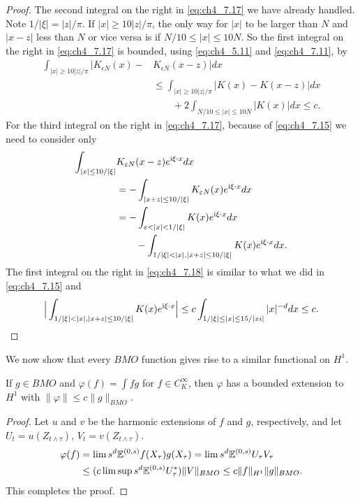 \begin{proof}
The second integral on the right in \eqref{eq:ch4_7.17} we have already handled. Note $1/|\xi| = |z|/\pi$. If $|x| \geq 10|z|/\pi$, the only way for $|x|$ to be larger than $N$ and $|x-z|$ less than $N$ or vice versa is if $N/10 \leq |x| \leq 10N$. So the first integral on the right in \eqref{eq:ch4_7.17} is bounded, using \eqref{eq:ch4_5.11} and \eqref{eq:ch4_7.11}, by
\begin{align*}
    \int_{|x|\geq 10|z|/\pi} |K_{\epsilon N}(x)- &K_{\epsilon N}(x-z)|dx \\
    &\leq \int_{|x|\geq 10|z|/\pi} |K(x) - K(x-z)|dx \\
    &\qquad +2\int_{N/10\leq|x|\leq 10N} |K(x)|dx \leq c.
\end{align*}
For the third integral on the right in \eqref{eq:ch4_7.17}, because of \eqref{eq:ch4_7.15} we need to consider only
\begin{align}\label{eq:ch4_7.18}
    \int_{|x|\leq 10/|\xi|} &K_{\epsilon N}(x-z)e^{\im\xi\cdot x}dx \\
    &= -\int_{|x+z|\leq 10/|\xi|} K_{\epsilon N}(x)e^{\im\xi\cdot x}dx \notag \\
    &= -\int_{\epsilon<|x|<1/|\xi|} K(x)e^{\im\xi\cdot x}dx \notag \\
    &\qquad-\int_{1/|\xi|<|x|,|x+z|\leq 10/|\xi|} K(x)e^{\im\xi\cdot x}dx. \notag
\end{align}
The first integral on the right in \eqref{eq:ch4_7.18} is similar to what we did in \eqref{eq:ch4_7.15} and
\[
    \Big|\int_{1/|\xi|<|x|,|x+z|\leq 10/|\xi|}K(x)e^{\im\xi\cdot x}\Big|\le c\int_{1/|\xi|\leq |x| \leq 15/|xi|}|x|^{-d}dx\le c.
\]
\end{proof}

We now show that every $BMO$ function gives rise to a similar functional on $H^1$.

\begin{proposition}\label{prop:ch4_7.12}
If $g \in BMO$ and $\varphi(f) = \int fg$ for $f \in C_K^\infty$, then $\varphi$ has a bounded extension to $H^1$ with $\|\varphi\| \leq c\|g\|_{BMO}$.
\end{proposition}

\begin{proof}
Let $u$ and $v$ be the harmonic extensions of $f$ and $g$, respectively, and let $U_t = u(Z_{t\wedge\tau})$, $V_t = v(Z_{t\wedge\tau})$.
\begin{align*}
    \varphi(f) &= \lim s^d\mathbb{E}^{(0,s)}f(X_\tau)g(X_\tau) = \lim s^d\mathbb{E}^{(0,s)}U_\tau V_\tau \\
    &\leq (c\limsup s^d\mathbb{E}^{(0,s)}U_\tau^*)\|V\|_{BMO} \leq c\|f\|_{H^1}\|g\|_{BMO}.
\end{align*}
This completes the proof.
\end{proof}

